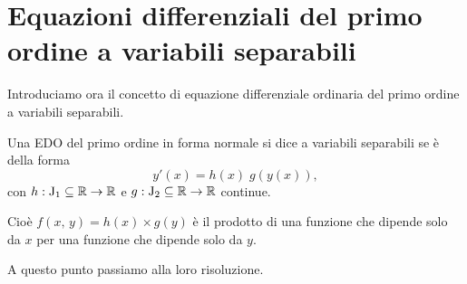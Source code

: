 \documentclass[../../analisi2]{subfiles}
\begin{document}
    \chapter{Equazioni differenziali del primo ordine a variabili separabili}

        Introduciamo ora il concetto di equazione differenziale ordinaria del primo ordine a variabili separabili.

        \begin{definizione}
            Una EDO del primo ordine in forma normale si dice a variabili separabili se è della forma
            \[
                y'(x) = h(x) \; g(y(x)),
            \]
            con \(h : \mathrm{J}_1 \subseteq \mathbb{R} \to \mathbb{R}\) e \(g : \mathrm{J}_2 \subseteq \mathbb{R} \to \mathbb{R}\) continue.

            Cioè \(f(x, \, y) = h(x) \times g(y)\) è il prodotto di una funzione che dipende solo da \(x\) per una funzione che dipende solo
            da \(y\).
        \end{definizione}

        A questo punto passiamo alla loro risoluzione.
\end{document}
